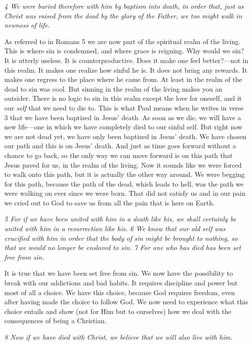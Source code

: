 \emph{4 We were buried therefore with him by baptism into death, in
order that, just as Christ was raised from the dead by the glory of the
Father, we too might walk in newness of life.}

As referred to in Romans 5 we are now part of the spiritual realm of the
living. This is where sin is condemned, and where grace is reigning. Why
would we sin? It is utterly useless. It is counterproductive. Does it
make one feel better?---not in this realm. It makes one realize how
sinful he is. It does not bring any rewards. It makes one regress to the
place where he came from. At least in the realm of the dead to sin was
cool. But sinning in the realm of the living makes you an outsider.
There is no logic to sin in this realm except the love for oneself, and
it our \emph{self} that we need to die to. This is what Paul means when
he writes in verse 3 that we have been baptized in Jesus' death. As soon
as we die, we will have a new life---one in which we have completely
died to our sinful self. But right now we are not dead yet, we have only
been baptized in Jesus' death. We have chosen our path and this is on
Jesus' death. And just as time goes forward without a chance to go back,
so the only way we can move forward is on this path that Jesus paved for
us, in the realm of the living. Now it sounds like we were forced to
walk onto this path, but it is actually the other way around. We were
begging for this path, because the path of the dead, which leads to
hell, was the path we were walking on ever since we were born. That did
not satisfy us and in our pain we cried out to God to save us from all
the pain that is here on Earth.

\emph{5 For if we have been united with him in a death like his, we
shall certainly be united with him in a resurrection like his. 6 We know
that our old self was crucified with him in order that the body of sin
might be brought to nothing, so that we would no longer be enslaved to
sin. 7 For one who has died has been set free from sin.}

It is true that we have been set free from sin. We now have the
possibility to break with our addictions and bad habits. It requires
discipline and power but most of all a choice. We have this choice,
because God requires freedom, even after having made the choice to
follow God. We now need to experience what this choice entails and show
(not for Him but to ourselves) how we deal with the consequences of
being a Christian.

\emph{8 Now if we have died with Christ, we believe that we will also
live with him.}

